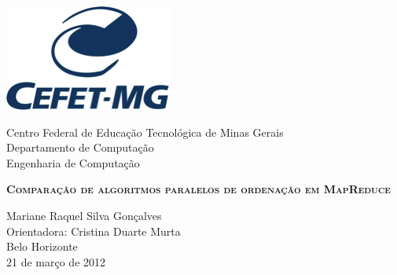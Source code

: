 

\begin{titlepage}


\begin{minipage}{0.2\textwidth}
\begin{flushleft} 
\includegraphics[scale=0.7]{figuras/logo.png} 
\end{flushleft}
\end{minipage}
\hfill
\begin{minipage}{0.7\textwidth}
\begin{flushleft}
\begin{center}
Centro Federal de Educação Tecnológica de Minas Gerais \\
Departamento de Computação \\
Engenharia de Computação
\end{center}
\end{flushleft}
\end{minipage}

\begin{center}

\vfill
\begin{Large}
\textbf{ \textsc{Comparação de algoritmos paralelos de ordenação em MapReduce}} \\[7cm]            
\end{Large}

Mariane Raquel Silva Gonçalves	 \\
Orientadora: Cristina Duarte Murta \\[3cm]

Belo Horizonte \\ 21 de março de 2012 \\
 
\end{center}
\end{titlepage}
